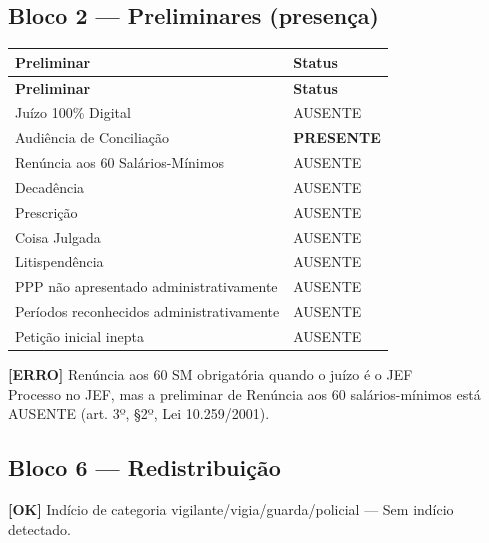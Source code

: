 \documentclass[12pt,a4paper]{article}
\newcommand{\statusOK}[1]{\textcolor{corOK}{\textbf{[OK]}} #1}
\newcommand{\statusERRO}[1]{\textcolor{corERRO}{\textbf{[ERRO]}} #1}
\begin{document}
\subsection{Bloco 2 --- Preliminares (presença)}

\begin{longtable}{p{8.5cm} p{4.5cm}}
  \toprule
  \textbf{Preliminar} & \textbf{Status} \\
  \midrule
  \endfirsthead
  \toprule
  \textbf{Preliminar} & \textbf{Status} \\
  \midrule
  \endhead
  Juízo 100\% Digital                           & AUSENTE \\
  Audiência de Conciliação                      & \textcolor{corOK}{\textbf{PRESENTE}} \\
  Renúncia aos 60 Salários-Mínimos              & AUSENTE \\
  Decadência                                    & AUSENTE \\
  Prescrição                                    & AUSENTE \\
  Coisa Julgada                                 & AUSENTE \\
  Litispendência                                & AUSENTE \\
  PPP não apresentado administrativamente       & AUSENTE \\
  Períodos reconhecidos administrativamente     & AUSENTE \\
  Petição inicial inepta                        & AUSENTE \\
  \bottomrule
\end{longtable}

\statusERRO{Renúncia aos 60 SM obrigatória quando o juízo é o JEF}\\
Processo no JEF, mas a preliminar de Renúncia aos 60 salários-mínimos está AUSENTE (art. 3º, §2º, Lei 10.259/2001).

\subsection{Bloco 6 --- Redistribuição}

\statusOK{Indício de categoria vigilante/vigia/guarda/policial} --- Sem indício detectado.
\end{document}
